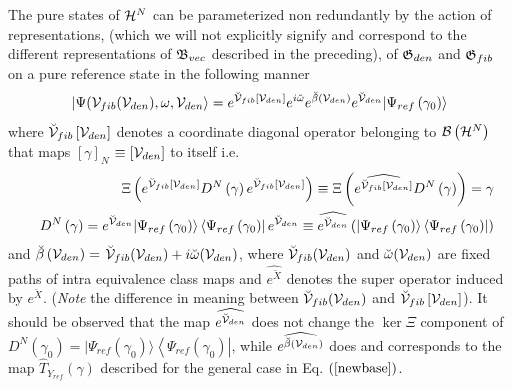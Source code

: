 The pure states of ${\cal H}^{N}$ can be parameterized non redundantly by
the action of representations, (which we will not explicitly signify and
correspond to the different representations of ${\frak B}_{vec}$ described
in the preceding), of ${\frak G}_{den}$ and ${\frak G}_{fib}$ on a pure
reference state in the following manner 
\begin{equation}
|\Psi ({\cal V}_{fib}({\cal V}_{den}),\omega ,{\cal V}_{den}\rangle =e^{%
{\cal \breve{V}}_{fib}\left[ {\cal V}_{den}\right] }e^{i\breve{\omega}}e^{%
{\cal \breve{\beta}}\left( {\cal V}_{den}\right) }e^{{\cal \breve{V}}%
_{den}}|\Psi _{ref}\left( \gamma _{0}\right) \rangle  \label{param}
\end{equation}%
where ${\cal \breve{V}}_{fib}\left[ {\cal V}_{den}\right] $ denotes a
coordinate diagonal operator belonging to ${\cal B}\left( {\cal H}%
^{N}\right) $ that maps $\left[ \gamma \right] _{N}$ $\equiv \left[ {\cal V}%
_{den}\right] $ to itself i.e. 
\begin{eqnarray}
&&\Xi \left( e^{{\cal \breve{V}}_{fib}\left[ {\cal V}_{den}\right]
}D^{N}\left( \gamma \right) e^{{\cal \breve{V}}_{fib}\left[ {\cal V}_{den}%
\right] }\right) \equiv \Xi \left( \widehat{e^{{\cal \breve{V}}_{fib}\left[ 
{\cal V}_{den}\right] }}D^{N}\left( \gamma \right) \right) =\gamma  \nonumber
\\
&&D^{N}\left( \gamma \right) =e^{{\cal \breve{V}}_{den}}|\Psi _{ref}\left(
\gamma _{0}\right) \rangle \left\langle \Psi _{ref}\left( \gamma _{0}\right)
\right| e^{{\cal \breve{V}}_{den}}\equiv \widehat{e^{{\cal \breve{V}}_{den}}}%
\left( |\Psi _{ref}\left( \gamma _{0}\right) \rangle \left\langle \Psi
_{ref}\left( \gamma _{0}\right) \right| \right)
\end{eqnarray}%
and ${\cal \breve{\beta}}\left( {\cal V}_{den}\right) =$ ${\cal \breve{V}}%
_{fib}({\cal V}_{den})+i{\cal \breve{\omega}}({\cal V}_{den})$, where ${\cal 
\breve{V}}_{fib}({\cal V}_{den})$ and ${\cal \breve{\omega}}({\cal V}_{den})$
are fixed paths of intra equivalence class maps and $\widehat{e^{\breve{X}}}$
denotes the super operator induced by $e^{\breve{X}}$. ({\em Note} the
difference in meaning between ${\cal \breve{V}}_{fib}({\cal V}_{den})$ and $%
{\cal \breve{V}}_{fib}\left[ {\cal V}_{den}\right] $). It should be observed
that the map $\widehat{e^{{\cal \breve{V}}_{den}}}$ does not change the $%
\ker \Xi $ component of $D^{N}\left( \gamma _{0}\right) =|\Psi _{ref}\left(
\gamma _{0}\right) \rangle \left\langle \Psi _{ref}\left( \gamma _{0}\right)
\right| $, while $\widehat{e^{{\cal \breve{\beta}}\left( {\cal V}%
_{den}\right) }}$ does and corresponds to the map $\hat{T}_{Y_{ref}}\left(
\gamma \right) $ described for the general case in Eq. $\left( \ref{newbase}%
\right) $.

